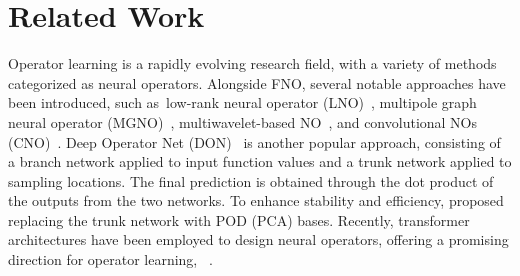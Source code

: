 \section{Related Work}
Operator learning is a rapidly evolving research field, with a variety of methods categorized as neural operators. Alongside FNO, several notable approaches have been introduced, such as~low-rank neural operator (LNO)~\citep{li2020fourier}, multipole graph neural operator (MGNO)~\citep{li2020multipole},  multiwavelet-based NO~\citep{gupta2021multiwavelet}, and convolutional NOs (CNO)~\citep{raonic2024convolutional}. Deep Operator Net (DON)~\citep{lu2021learning} is another popular  approach, consisting  of a branch network applied to input function values and a trunk network applied to sampling locations. The final prediction is obtained through the dot product of the outputs from the two networks. To enhance stability and efficiency, \citet{lu2022comprehensive} proposed replacing the trunk network with POD (PCA) bases. Recently, transformer architectures have been employed to design neural operators, offering a promising direction for operator learning, \eg~\citep{cao2021choose,li2022transformer,hao2023gnot}.



